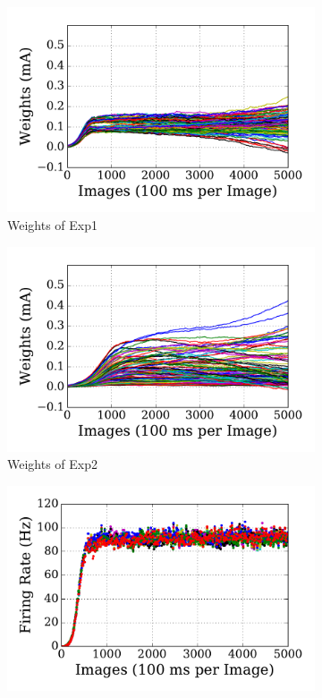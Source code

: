 \begin{figure}
	\centering
	\begin{subfigure}[t]{0.45\textwidth}
		\includegraphics[width=\textwidth]{pics_sdlm/00_exp_SAE_Orig/exp1_weights_s.pdf}
		\caption{Weights of Exp1}
	\end{subfigure}
	\begin{subfigure}[t]{0.45\textwidth}
		\includegraphics[width=\textwidth]{pics_sdlm/00_exp_SAE_Orig/exp2_weights_s.pdf}
		\caption{Weights of Exp2}
	\end{subfigure}
	\begin{subfigure}[t]{0.45\textwidth}
		\includegraphics[width=\textwidth]{pics_sdlm/00_exp_SAE_Orig/exp1_recon_s.pdf}

\end{subfigure}
\end{figure}
